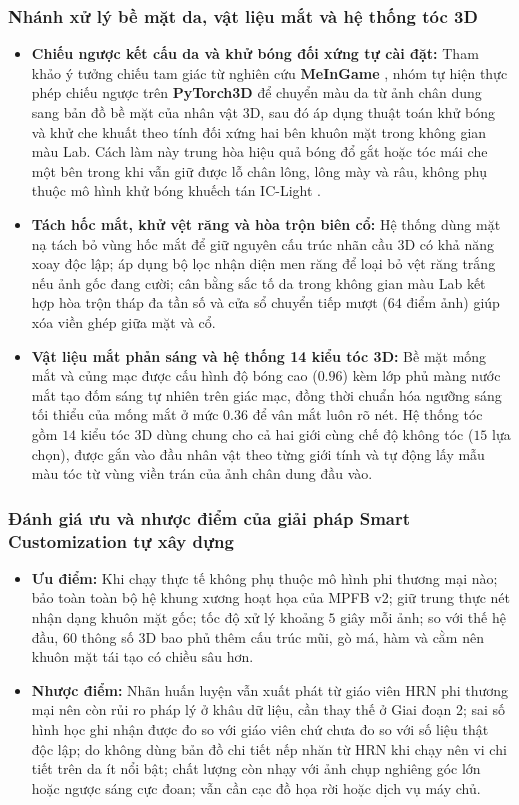\subsubsection{Nhánh xử lý bề mặt da, vật liệu mắt và hệ thống tóc 3D}
\begin{itemize}
    \item \textbf{Chiếu ngược kết cấu da và khử bóng đối xứng tự cài đặt:} Tham khảo ý tưởng chiếu tam giác từ nghiên cứu \textbf{MeInGame} \cite{meingame}, nhóm tự hiện thực phép chiếu ngược trên \textbf{PyTorch3D} \cite{pytorch3d} để chuyển màu da từ ảnh chân dung sang bản đồ bề mặt của nhân vật 3D, sau đó áp dụng thuật toán khử bóng và khử che khuất theo tính đối xứng hai bên khuôn mặt trong không gian màu Lab. Cách làm này trung hòa hiệu quả bóng đổ gắt hoặc tóc mái che một bên trong khi vẫn giữ được lỗ chân lông, lông mày và râu, không phụ thuộc mô hình khử bóng khuếch tán IC-Light \cite{iclight}.
    \item \textbf{Tách hốc mắt, khử vệt răng và hòa trộn biên cổ:} Hệ thống dùng mặt nạ tách bỏ vùng hốc mắt để giữ nguyên cấu trúc nhãn cầu 3D có khả năng xoay độc lập; áp dụng bộ lọc nhận diện men răng để loại bỏ vệt răng trắng nếu ảnh gốc đang cười; cân bằng sắc tố da trong không gian màu Lab kết hợp hòa trộn tháp đa tần số và cửa sổ chuyển tiếp mượt ($64$ điểm ảnh) giúp xóa viền ghép giữa mặt và cổ.
    \item \textbf{Vật liệu mắt phản sáng và hệ thống 14 kiểu tóc 3D:} Bề mặt mống mắt và củng mạc được cấu hình độ bóng cao ($0.96$) kèm lớp phủ màng nước mắt tạo đốm sáng tự nhiên trên giác mạc, đồng thời chuẩn hóa ngưỡng sáng tối thiểu của mống mắt ở mức $0.36$ để vân mắt luôn rõ nét. Hệ thống tóc gồm $14$ kiểu tóc 3D dùng chung cho cả hai giới cùng chế độ không tóc ($15$ lựa chọn), được gắn vào đầu nhân vật theo từng giới tính và tự động lấy mẫu màu tóc từ vùng viền trán của ảnh chân dung đầu vào.
\end{itemize}

\subsubsection{Đánh giá ưu và nhược điểm của giải pháp Smart Customization tự xây dựng}
\begin{itemize}
    \item \textbf{Ưu điểm:} Khi chạy thực tế không phụ thuộc mô hình phi thương mại nào; bảo toàn toàn bộ hệ khung xương hoạt họa của MPFB v2; giữ trung thực nét nhận dạng khuôn mặt gốc; tốc độ xử lý khoảng $5$ giây mỗi ảnh; so với thế hệ đầu, $60$ thông số 3D bao phủ thêm cấu trúc mũi, gò má, hàm và cằm nên khuôn mặt tái tạo có chiều sâu hơn.
    \item \textbf{Nhược điểm:} Nhãn huấn luyện vẫn xuất phát từ giáo viên HRN phi thương mại nên còn rủi ro pháp lý ở khâu dữ liệu, cần thay thế ở Giai đoạn 2; sai số hình học ghi nhận được đo so với giáo viên chứ chưa đo so với số liệu thật độc lập; do không dùng bản đồ chi tiết nếp nhăn từ HRN khi chạy nên vi chi tiết trên da ít nổi bật; chất lượng còn nhạy với ảnh chụp nghiêng góc lớn hoặc ngược sáng cực đoan; vẫn cần cạc đồ họa rời hoặc dịch vụ máy chủ.
\end{itemize}
